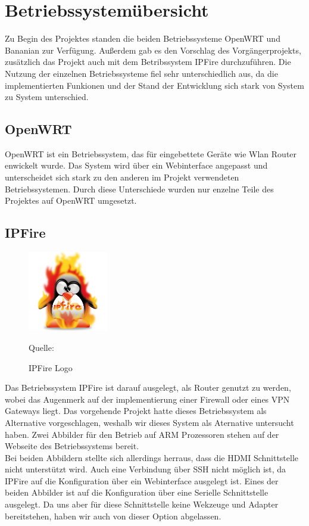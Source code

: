 \chapter{Betriebssystemübersicht}

Zu Begin des Projektes standen die beiden Betriebssysteme OpenWRT und Bananian zur Verfügung.
Außerdem gab es den Vorschlag des Vorgängerprojekts, zusätzlich das Projekt auch mit dem Betribssystem IPFire durchzuführen.
Die Nutzung der einzelnen Betriebssysteme fiel sehr unterschiedlich aus, da die implementierten Funkionen und der Stand der Entwicklung sich stark von System zu System unterschied.

\section{OpenWRT}
OpenWRT ist ein Betriebssystem, das für eingebettete Geräte wie Wlan Router enwickelt wurde.
Das System wird über ein Webinterface angepasst und unterscheidet sich stark zu den anderen im Projekt verwendeten Betriebssystemen.
Durch diese Unterschiede wurden nur enzelne Teile des Projektes auf OpenWRT umgesetzt.

\section{IPFire}
\begin{figure}
\centering
\includegraphics[width=3.5cm]{pictures/Jakob/IPFire}
\caption{IPFire Logo}
Quelle: \cite{fire1}
\end{figure}
Das Betriebssystem IPFire ist darauf ausgelegt, als Router genutzt zu werden, wobei das Augenmerk auf der implementierung einer Firewall oder eines VPN Gateways liegt.
Das vorgehende Projekt hatte dieses Betriebssystem als Alternative vorgeschlagen, weshalb wir dieses System als Aternative untersucht haben.
Zwei Abbilder für den Betrieb auf ARM Prozessoren stehen auf der Webseite des Betriebssystems bereit. \cite{fire} \\
Bei beiden Abbildern stellte sich allerdings herraus, dass die HDMI Schnittstelle nicht unterstützt wird.
Auch eine Verbindung über SSH nicht möglich ist, da IPFire auf die Konfiguration über ein Webinterface ausgelegt ist.
Eines der beiden Abbilder ist auf die Konfiguration über eine Serielle Schnittstelle ausgelegt. Da uns aber für diese Schnittstelle keine Wekzeuge und Adapter bereitstehen, haben wir auch von dieser Option abgelassen.\\

